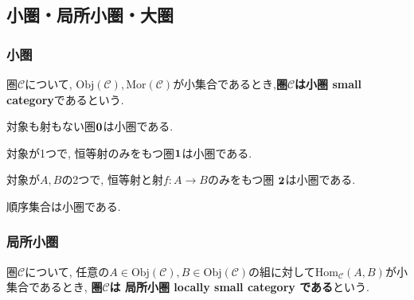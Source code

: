 \subsection{小圏・局所小圏・大圏}
\subsubsection{小圏}
\begin{Def}
圏$\mathscr{C}$について, $\mathrm{Obj}(\mathscr{C}),\mathrm{Mor}(\mathscr{C})$が小集合であるとき,{\bf 圏$\mathscr{C}$は小圏 small category}であるという.
\end{Def}
\begin{Prop}
対象も射もない圏${\bf 0}$は小圏である.
\end{Prop}
\begin{comment}
\begin{proof}
\end{proof}
\end{comment}

\begin{Prop}
対象が1つで, 恒等射のみをもつ圏${\bf 1}$は小圏である.
\end{Prop}
\begin{comment}
\begin{proof}
\end{proof}
\end{comment}

\begin{Prop}
対象が$A,B$の2つで, 
恒等射と射$f:A\rightarrow B$のみをもつ圏
${\bf 2}$は小圏である.
\end{Prop}
\begin{comment}
\begin{proof}
\end{proof}
\end{comment}

\begin{Prop}
順序集合は小圏である.
\end{Prop}
\begin{comment}
\begin{proof}
\end{proof}
\end{comment}

\subsubsection{局所小圏}
\begin{Def}
圏$\mathscr{C}$について, 任意の$A\in\mathrm{Obj}(\mathscr{C}),B\in\mathrm{Obj}(\mathscr{C})$の組に対して$\mathrm{Hom}_{\mathscr{C}}(A,B)$が小集合であるとき, {\bf 圏$\mathscr{C}$は 局所小圏 locally small category である}という.
\end{Def}
